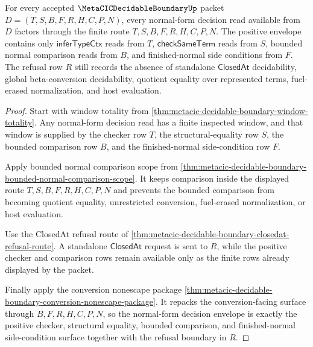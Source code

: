 \begin{theorem}
\label{thm:metacic-decidable-boundary-normal-form-decision-envelope}
For every accepted $\MetaCICDecidableBoundaryUp$ packet $D=(T,S,B,F,R,H,C,P,N)$, every normal-form decision read available from $D$ factors through the finite route $T,S,B,F,R,H,C,P,N$. The positive envelope contains only $\mathsf{inferTypeCtx}$ reads from $T$, $\mathsf{checkSameTerm}$ reads from $S$, bounded normal comparison reads from $B$, and finished-normal side conditions from $F$. The refusal row $R$ still records the absence of standalone $\mathsf{ClosedAt}$ decidability, global beta-conversion decidability, quotient equality over represented terms, fuel-erased normalization, and host evaluation.
\end{theorem}
\begin{proof}
Start with window totality from \autoref{thm:metacic-decidable-boundary-window-totality}. Any normal-form decision read has a finite inspected window, and that window is supplied by the checker row $T$, the structural-equality row $S$, the bounded comparison row $B$, and the finished-normal side-condition row $F$.

Apply bounded normal comparison scope from \autoref{thm:metacic-decidable-boundary-bounded-normal-comparison-scope}. It keeps comparison inside the displayed route $T,S,B,F,R,H,C,P,N$ and prevents the bounded comparison from becoming quotient equality, unrestricted conversion, fuel-erased normalization, or host evaluation.

Use the ClosedAt refusal route of \autoref{thm:metacic-decidable-boundary-closedat-refusal-route}. A standalone $\mathsf{ClosedAt}$ request is sent to $R$, while the positive checker and comparison rows remain available only as the finite rows already displayed by the packet.

Finally apply the conversion nonescape package \autoref{thm:metacic-decidable-boundary-conversion-nonescape-package}. It repacks the conversion-facing surface through $B,F,R,H,C,P,N$, so the normal-form decision envelope is exactly the positive checker, structural equality, bounded comparison, and finished-normal side-condition surface together with the refusal boundary in $R$.
\end{proof}


